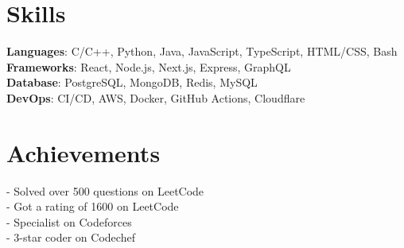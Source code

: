 \documentclass[a4paper,12pt]{article}
\begin{document}
\section{Skills}
\begin{itemize}[leftmargin=0.15in, label={}]
  \small{\item{
    \textbf{Languages}{: C/C++, Python, Java, JavaScript, TypeScript, HTML/CSS, Bash} \\
    \textbf{Frameworks}{: React, Node.js, Next.js, Express, GraphQL} \\
    \textbf{Database}{: PostgreSQL, MongoDB, Redis, MySQL} \\
    \textbf{DevOps}{: CI/CD, AWS, Docker, GitHub Actions, Cloudflare}
  }}
\end{itemize}

\section{Achievements}
\begin{itemize}[leftmargin=0.15in, label={}]
  \small{\item{
    {- Solved over 500 questions on LeetCode} \\
    {- Got a rating of 1600 on LeetCode} \\
    {- Specialist on Codeforces}  \\
    {- 3-star coder on Codechef} 
  }}
\end{itemize}

\vfill
{}
\end{document}
